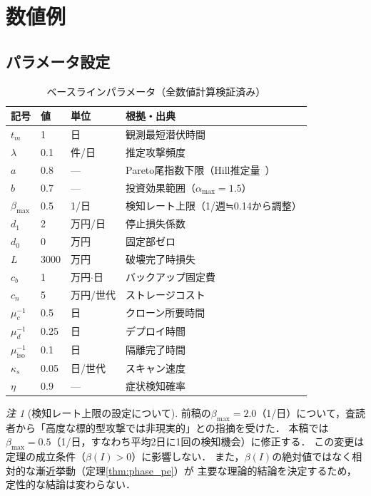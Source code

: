 \documentclass[12pt,a4paper]{article}
\theoremstyle{plain}
\theoremstyle{definition}
\theoremstyle{remark}
\newtheorem{remark}[theorem]{注}
\newcommand{\betaI}{\beta(I)}
\begin{document}
\section{数値例}
\label{sec:numerical}

\subsection{パラメータ設定}

\begin{table}[h]
\centering
\caption{ベースラインパラメータ（全数値計算検証済み）}
\label{tab:params}
\begin{tabular}{@{}lll p{60mm}@{}}
\toprule
記号 & 値 & 単位 & 根拠・出典 \\
\midrule
$t_m$ & 1 & 日 & 観測最短潜伏時間~\cite{mandiant2023} \\
$\lambda$ & 0.1 & 件/日 & 推定攻撃頻度 \\
$a$ & 0.8 & --- & Pareto尾指数下限（Hill推定量~\cite{hill1975}） \\
$b$ & 0.7 & --- & 投資効果範囲（$\alpha_{\max}=1.5$）\\
$\beta_{\max}$ & 0.5 & 1/日 & 検知レート上限（1/週≒0.14から調整）\\
$d_1$ & 2 & 万円/日 & 停止損失係数 \\
$d_0$ & 0 & 万円 & 固定部ゼロ \\
$L$ & 3000 & 万円 & 破壊完了時損失 \\
$c_b$ & 1 & 万円$\cdot$日 & バックアップ固定費 \\
$c_n$ & 5 & 万円/世代 & ストレージコスト \\
$\mu_c^{-1}$ & 0.5 & 日 & クローン所要時間 \\
$\mu_d^{-1}$ & 0.25 & 日 & デプロイ時間 \\
$\mu_{\mathrm{iso}}^{-1}$ & 0.1 & 日 & 隔離完了時間 \\
$\kappa_s$ & 0.05 & 日/世代 & スキャン速度 \\
$\eta$ & 0.9 & --- & 症状検知確率 \\
\bottomrule
\end{tabular}
\end{table}

\begin{remark}[検知レート上限の設定について]
前稿の$\beta_{\max}=2.0$（1/日）について，査読者から「高度な標的型攻撃では非現実的」との指摘を受けた．
本稿では$\beta_{\max}=0.5$（1/日，すなわち平均2日に1回の検知機会）に修正する．
この変更は定理の成立条件（$\betaI>0$）に影響しない．
また，$\betaI$の絶対値ではなく相対的な漸近挙動（定理\ref{thm:phase_pe}）が
主要な理論的結論を決定するため，定性的な結論は変わらない．
\end{remark}
\end{document}
